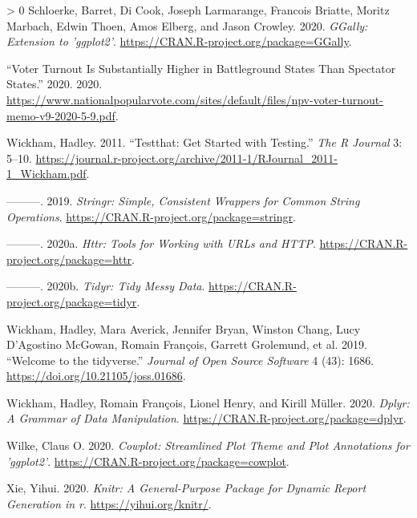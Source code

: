 \documentclass[
]{article}
\newlength{\cslhangindent}
\newenvironment{CSLReferences}[3] %
 {%
  \setlength{\parindent}{0pt}
  \ifodd #1 \everypar{\setlength{\hangindent}{\cslhangindent}}\ignorespaces\fi
  \ifnum #2 > 0
  \setlength{\parskip}{#3\baselineskip}
  \fi
 }%
 {}
\begin{document}
\begin{CSLReferences}{1}{0}
\leavevmode\hypertarget{ref-GGally}{}%
Schloerke, Barret, Di Cook, Joseph Larmarange, Francois Briatte, Moritz
Marbach, Edwin Thoen, Amos Elberg, and Jason Crowley. 2020.
\emph{GGally: Extension to 'ggplot2'}.
\url{https://CRAN.R-project.org/package=GGally}.

\leavevmode\hypertarget{ref-US_voter_turnout}{}%
{``Voter Turnout Is Substantially Higher in Battleground States Than
Spectator States.''} 2020. 2020.
\url{https://www.nationalpopularvote.com/sites/default/files/npv-voter-turnout-memo-v9-2020-5-9.pdf}.

\leavevmode\hypertarget{ref-testthat}{}%
Wickham, Hadley. 2011. {``Testthat: Get Started with Testing.''}
\emph{The R Journal} 3: 5--10.
\url{https://journal.r-project.org/archive/2011-1/RJournal_2011-1_Wickham.pdf}.

\leavevmode\hypertarget{ref-stringr}{}%
---------. 2019. \emph{Stringr: Simple, Consistent Wrappers for Common
String Operations}. \url{https://CRAN.R-project.org/package=stringr}.

\leavevmode\hypertarget{ref-httr}{}%
---------. 2020a. \emph{Httr: Tools for Working with URLs and HTTP}.
\url{https://CRAN.R-project.org/package=httr}.

\leavevmode\hypertarget{ref-tidyr}{}%
---------. 2020b. \emph{Tidyr: Tidy Messy Data}.
\url{https://CRAN.R-project.org/package=tidyr}.

\leavevmode\hypertarget{ref-tidyverse}{}%
Wickham, Hadley, Mara Averick, Jennifer Bryan, Winston Chang, Lucy
D'Agostino McGowan, Romain François, Garrett Grolemund, et al. 2019.
{``Welcome to the {tidyverse}.''} \emph{Journal of Open Source Software}
4 (43): 1686. \url{https://doi.org/10.21105/joss.01686}.

\leavevmode\hypertarget{ref-dplyr}{}%
Wickham, Hadley, Romain François, Lionel Henry, and Kirill Müller. 2020.
\emph{Dplyr: A Grammar of Data Manipulation}.
\url{https://CRAN.R-project.org/package=dplyr}.

\leavevmode\hypertarget{ref-cowplot}{}%
Wilke, Claus O. 2020. \emph{Cowplot: Streamlined Plot Theme and Plot
Annotations for 'ggplot2'}.
\url{https://CRAN.R-project.org/package=cowplot}.

\leavevmode\hypertarget{ref-knitr}{}%
Xie, Yihui. 2020. \emph{Knitr: A General-Purpose Package for Dynamic
Report Generation in r}. \url{https://yihui.org/knitr/}.

\end{CSLReferences}
\end{document}

